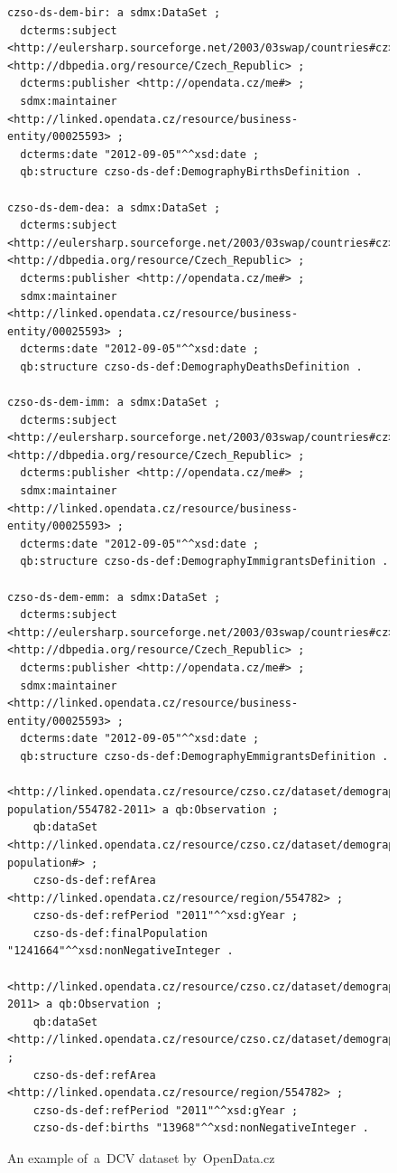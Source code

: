 \begin{figure}
\begin{verbatim}
czso-ds-dem-bir: a sdmx:DataSet ;
  dcterms:subject <http://eulersharp.sourceforge.net/2003/03swap/countries#cz>, <http://dbpedia.org/resource/Czech_Republic> ;
  dcterms:publisher <http://opendata.cz/me#> ;
  sdmx:maintainer <http://linked.opendata.cz/resource/business-entity/00025593> ;
  dcterms:date "2012-09-05"^^xsd:date ;
  qb:structure czso-ds-def:DemographyBirthsDefinition .
  
czso-ds-dem-dea: a sdmx:DataSet ;
  dcterms:subject <http://eulersharp.sourceforge.net/2003/03swap/countries#cz>, <http://dbpedia.org/resource/Czech_Republic> ;
  dcterms:publisher <http://opendata.cz/me#> ;
  sdmx:maintainer <http://linked.opendata.cz/resource/business-entity/00025593> ;
  dcterms:date "2012-09-05"^^xsd:date ;
  qb:structure czso-ds-def:DemographyDeathsDefinition .
  
czso-ds-dem-imm: a sdmx:DataSet ;
  dcterms:subject <http://eulersharp.sourceforge.net/2003/03swap/countries#cz>, <http://dbpedia.org/resource/Czech_Republic> ;
  dcterms:publisher <http://opendata.cz/me#> ;
  sdmx:maintainer <http://linked.opendata.cz/resource/business-entity/00025593> ;
  dcterms:date "2012-09-05"^^xsd:date ;
  qb:structure czso-ds-def:DemographyImmigrantsDefinition .
  
czso-ds-dem-emm: a sdmx:DataSet ;
  dcterms:subject <http://eulersharp.sourceforge.net/2003/03swap/countries#cz>, <http://dbpedia.org/resource/Czech_Republic> ;
  dcterms:publisher <http://opendata.cz/me#> ;
  sdmx:maintainer <http://linked.opendata.cz/resource/business-entity/00025593> ;
  dcterms:date "2012-09-05"^^xsd:date ;
  qb:structure czso-ds-def:DemographyEmmigrantsDefinition .
  
<http://linked.opendata.cz/resource/czso.cz/dataset/demography/final-population/554782-2011> a qb:Observation ;
    qb:dataSet <http://linked.opendata.cz/resource/czso.cz/dataset/demography/final-population#> ;
    czso-ds-def:refArea <http://linked.opendata.cz/resource/region/554782> ;
    czso-ds-def:refPeriod "2011"^^xsd:gYear ;
    czso-ds-def:finalPopulation "1241664"^^xsd:nonNegativeInteger .

<http://linked.opendata.cz/resource/czso.cz/dataset/demography/births/554782-2011> a qb:Observation ;
    qb:dataSet <http://linked.opendata.cz/resource/czso.cz/dataset/demography/births#> ;
    czso-ds-def:refArea <http://linked.opendata.cz/resource/region/554782> ;
    czso-ds-def:refPeriod "2011"^^xsd:gYear ;
    czso-ds-def:births "13968"^^xsd:nonNegativeInteger .
\end{verbatim}\normalsize
\caption{An example of~a~DCV dataset by~OpenData.cz}
\label{fig:example-dcv-dataset}
\end{figure}

